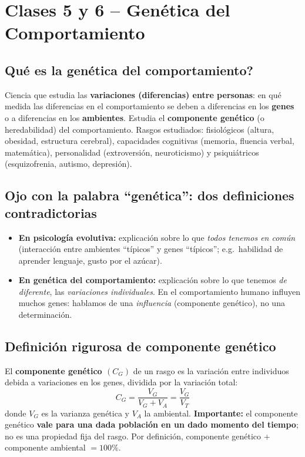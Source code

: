 \documentclass[11pt, a4paper]{article}
\begin{document}
\section{Clases 5 y 6 -- Gen\'etica del Comportamiento}

\subsection{\textquestiondown Qu\'e es la gen\'etica del comportamiento?}

Ciencia que estudia las \textbf{variaciones (diferencias) entre personas}: en qu\'e medida las diferencias en el comportamiento se deben a diferencias en los \textbf{genes} o a diferencias en los \textbf{ambientes}. Estudia el \textbf{componente gen\'etico} (o heredabilidad) del comportamiento. Rasgos estudiados: fisiol\'ogicos (altura, obesidad, estructura cerebral), capacidades cognitivas (memoria, fluencia verbal, matem\'atica), personalidad (extroversi\'on, neuroticismo) y psiqui\'atricos (esquizofrenia, autismo, depresi\'on).

\subsection{Ojo con la palabra ``gen\'etica'': dos definiciones contradictorias}

\begin{itemize}[nosep]
    \item \textbf{En psicolog\'ia evolutiva:} explicaci\'on sobre lo que \emph{todos tenemos en com\'un} (interacci\'on entre ambientes ``t\'ipicos'' y genes ``t\'ipicos''; e.g.\ habilidad de aprender lenguaje, gusto por el az\'ucar).
    \item \textbf{En gen\'etica del comportamiento:} explicaci\'on sobre lo que tenemos \emph{de diferente}, las \emph{variaciones individuales}. En el comportamiento humano influyen muchos genes: hablamos de una \emph{influencia} (componente gen\'etico), no una determinaci\'on.
\end{itemize}

\subsection{Definici\'on rigurosa de componente gen\'etico}

El \textbf{componente gen\'etico $(C_G)$} de un rasgo es la variaci\'on entre individuos debida a variaciones en los genes, dividida por la variaci\'on total:
\[
    C_G = \frac{V_G}{V_G + V_A} = \frac{V_G}{V_T}
\]
donde $V_G$ es la varianza gen\'etica y $V_A$ la ambiental. \textbf{Importante:} el componente gen\'etico \textbf{vale para una dada poblaci\'on en un dado momento del tiempo}; no es una propiedad fija del rasgo. Por definici\'on, componente gen\'etico + componente ambiental $= 100\%$.
\end{document}
